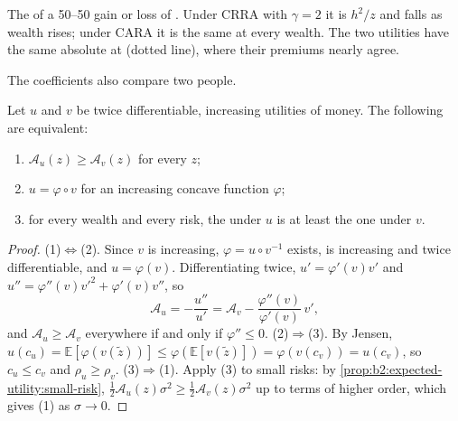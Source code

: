 \begin{omfigure}

{\small The  of a 50--50 gain or loss of . Under CRRA with $\gamma = 2$ it is
$h^2/z$ and falls as wealth rises; under CARA it is the same at every wealth. The two utilities have
the same absolute  at  (dotted line), where their premiums nearly agree.}
\end{omfigure}

The coefficients also compare two people.

\begin{proposition}\label{prop:b2:expected-utility:pratt}
Let $u$ and $v$ be twice differentiable, increasing utilities of money. The following are equivalent:
\begin{enumerate}
  \item $\mathcal{A}_u(z) \ge \mathcal{A}_v(z)$ for every $z$;
  \item $u = \varphi \circ v$ for an increasing concave function $\varphi$;
  \item for every wealth and every risk, the  under $u$ is at least the one under $v$.
\end{enumerate}
\end{proposition}

\begin{proof}
(1)$\iff$(2). Since $v$ is increasing, $\varphi = u \circ v^{-1}$ exists, is increasing and twice
differentiable, and $u = \varphi(v)$. Differentiating twice, $u' = \varphi'(v)v'$ and $u'' =
\varphi''(v)v'^2 + \varphi'(v)v''$, so
\[
\mathcal{A}_u = -\frac{u''}{u'} = \mathcal{A}_v - \frac{\varphi''(v)}{\varphi'(v)}\,v' ,
\]
and $\mathcal{A}_u \ge \mathcal{A}_v$ everywhere if and only if $\varphi'' \le 0$. (2)$\Rightarrow$(3).
By Jensen, $u(c_u) = \mathbb{E}[\varphi(v(\tilde z))] \le \varphi(\mathbb{E}[v(\tilde z)]) =
\varphi(v(c_v)) = u(c_v)$, so $c_u \le c_v$ and $\rho_u \ge \rho_v$. (3)$\Rightarrow$(1). Apply (3) to
small risks: by \cref{prop:b2:expected-utility:small-risk}, $\tfrac12\mathcal{A}_u(z)\sigma^2 \ge
\tfrac12\mathcal{A}_v(z)\sigma^2$ up to terms of higher order, which gives (1) as $\sigma \to 0$.
\end{proof}

